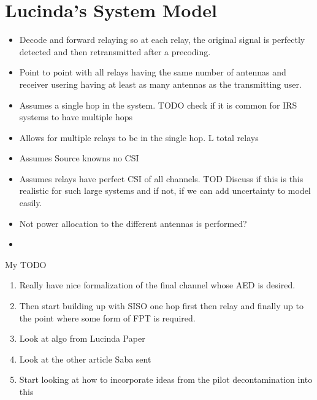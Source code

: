 \documentclass[12pt,a4paper]{report}
\begin{document}
\section{Lucinda's System Model}
\begin{itemize}
\item Decode and forward relaying so at each relay, the original signal is perfectly detected and then retransmitted after a precoding. 
\item Point to point with all relays having the same number of antennas and receiver usering having at least as many antennas as the transmitting user.
\item Assumes a single hop in the system. TODO check if it is common for IRS systems to have multiple hops
\item Allows for multiple relays to be in the single hop. L total relays
\item Assumes Source knowns no CSI
\item Assumes relays have perfect CSI of all channels. TOD Discuss if this is this realistic for such large systems and if not, if we can add uncertainty to model easily.
\item Not power allocation to the different antennas is performed?
\item 
\end{itemize}
My TODO
\begin{enumerate}
	\item
		Really have nice formalization of the final channel whose AED is desired.
	\item
		Then start building up with SISO one hop first then relay and finally up to the point where some form of FPT is
		required.
	\item
		Look at algo from Lucinda Paper
	\item
		Look at the other article Saba sent
	\item
		Start looking at how to incorporate ideas from the pilot decontamination into this
\end{enumerate}
\end{document}
